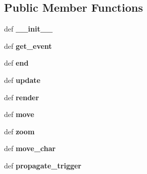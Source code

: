 \subsection*{\-Public \-Member \-Functions}
\begin{DoxyCompactItemize}
\item 
\hypertarget{classsrc_1_1print_world_1_1_world_viewer_a7a2696805539e858a95ee4cf45eaf1c7}{def {\bfseries \-\_\-\-\_\-init\-\_\-\-\_\-}}\label{classsrc_1_1print_world_1_1_world_viewer_a7a2696805539e858a95ee4cf45eaf1c7}

\item 
\hypertarget{classsrc_1_1print_world_1_1_world_viewer_a13a6b8596015312e1fde150640ac542e}{def {\bfseries get\-\_\-event}}\label{classsrc_1_1print_world_1_1_world_viewer_a13a6b8596015312e1fde150640ac542e}

\item 
\hypertarget{classsrc_1_1print_world_1_1_world_viewer_a1c80356e21e257f8a9f6f123b1c9970d}{def {\bfseries end}}\label{classsrc_1_1print_world_1_1_world_viewer_a1c80356e21e257f8a9f6f123b1c9970d}

\item 
\hypertarget{classsrc_1_1print_world_1_1_world_viewer_aa39257d89f22103040677719c3f8e90e}{def {\bfseries update}}\label{classsrc_1_1print_world_1_1_world_viewer_aa39257d89f22103040677719c3f8e90e}

\item 
\hypertarget{classsrc_1_1print_world_1_1_world_viewer_a6bf228bb9cd15d34ef19c624fdc79c68}{def {\bfseries render}}\label{classsrc_1_1print_world_1_1_world_viewer_a6bf228bb9cd15d34ef19c624fdc79c68}

\item 
\hypertarget{classsrc_1_1print_world_1_1_world_viewer_a4f40dfbf0e262ffbe723900a2f5cbe4f}{def {\bfseries move}}\label{classsrc_1_1print_world_1_1_world_viewer_a4f40dfbf0e262ffbe723900a2f5cbe4f}

\item 
\hypertarget{classsrc_1_1print_world_1_1_world_viewer_a552043b414d6eab1d78d2816c06f81af}{def {\bfseries zoom}}\label{classsrc_1_1print_world_1_1_world_viewer_a552043b414d6eab1d78d2816c06f81af}

\item 
\hypertarget{classsrc_1_1print_world_1_1_world_viewer_ae16b4b78785490c05644cd54fa2fd88a}{def {\bfseries move\-\_\-char}}\label{classsrc_1_1print_world_1_1_world_viewer_ae16b4b78785490c05644cd54fa2fd88a}

\item 
\hypertarget{classsrc_1_1print_world_1_1_world_viewer_a4126bfb1941eece5f72ecc7e7a20f4c2}{def {\bfseries propagate\-\_\-trigger}}\label{classsrc_1_1print_world_1_1_world_viewer_a4126bfb1941eece5f72ecc7e7a20f4c2}

\end{DoxyCompactItemize}
